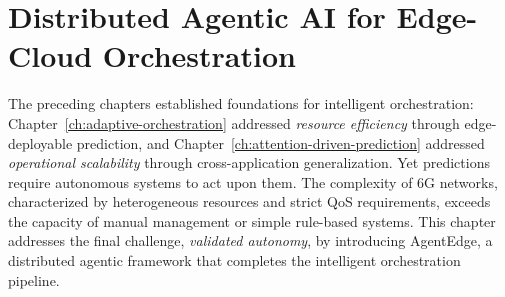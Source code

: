 \chapter{Distributed Agentic AI for Edge-Cloud Orchestration}
\label{ch:distributed-agentic-ai}

The preceding chapters established foundations for intelligent orchestration: Chapter~\ref{ch:adaptive-orchestration} addressed \textit{resource efficiency} through edge-deployable prediction, and Chapter~\ref{ch:attention-driven-prediction} addressed \textit{operational scalability} through cross-application generalization. Yet predictions require autonomous systems to act upon them. The complexity of \ac{6G} networks, characterized by heterogeneous resources and strict \ac{QoS} requirements, exceeds the capacity of manual management or simple rule-based systems. This chapter addresses the final challenge, \textit{validated autonomy}, by introducing \ac{AgentEdge}, a distributed agentic framework that completes the intelligent orchestration pipeline.






